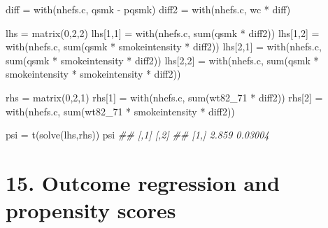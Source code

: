 \documentclass[
  10pt,
  a4paper,
]{book}
\newenvironment{Shaded}{\begin{snugshade}}{\end{snugshade}}
\newcommand{\DecValTok}[1]{\textcolor[rgb]{0.68,0.00,0.00}{#1}}
\newcommand{\DocumentationTok}[1]{\textcolor[rgb]{0.37,0.37,0.37}{\textit{#1}}}
\newcommand{\FunctionTok}[1]{\textcolor[rgb]{0.28,0.35,0.67}{#1}}
\newcommand{\NormalTok}[1]{\textcolor[rgb]{0.00,0.46,0.62}{#1}}
\newcommand{\OtherTok}[1]{\textcolor[rgb]{0.00,0.46,0.62}{#1}}
\newcommand{\SpecialCharTok}[1]{\textcolor[rgb]{0.37,0.37,0.37}{#1}}
\begin{document}
\begin{Shaded}
\begin{Highlighting}[]
\NormalTok{diff }\OtherTok{=} \FunctionTok{with}\NormalTok{(nhefs.c, qsmk }\SpecialCharTok{{-}}\NormalTok{ pqsmk)}
\NormalTok{diff2 }\OtherTok{=} \FunctionTok{with}\NormalTok{(nhefs.c, wc }\SpecialCharTok{*}\NormalTok{ diff)}

\NormalTok{lhs }\OtherTok{=} \FunctionTok{matrix}\NormalTok{(}\DecValTok{0}\NormalTok{,}\DecValTok{2}\NormalTok{,}\DecValTok{2}\NormalTok{)}
\NormalTok{lhs[}\DecValTok{1}\NormalTok{,}\DecValTok{1}\NormalTok{] }\OtherTok{=} \FunctionTok{with}\NormalTok{(nhefs.c, }\FunctionTok{sum}\NormalTok{(qsmk }\SpecialCharTok{*}\NormalTok{ diff2))}
\NormalTok{lhs[}\DecValTok{1}\NormalTok{,}\DecValTok{2}\NormalTok{] }\OtherTok{=} \FunctionTok{with}\NormalTok{(nhefs.c, }\FunctionTok{sum}\NormalTok{(qsmk }\SpecialCharTok{*}\NormalTok{ smokeintensity  }\SpecialCharTok{*}\NormalTok{ diff2))}
\NormalTok{lhs[}\DecValTok{2}\NormalTok{,}\DecValTok{1}\NormalTok{] }\OtherTok{=} \FunctionTok{with}\NormalTok{(nhefs.c, }\FunctionTok{sum}\NormalTok{(qsmk }\SpecialCharTok{*}\NormalTok{ smokeintensity }\SpecialCharTok{*}\NormalTok{ diff2))}
\NormalTok{lhs[}\DecValTok{2}\NormalTok{,}\DecValTok{2}\NormalTok{] }\OtherTok{=} \FunctionTok{with}\NormalTok{(nhefs.c, }\FunctionTok{sum}\NormalTok{(qsmk }\SpecialCharTok{*}\NormalTok{ smokeintensity }\SpecialCharTok{*}\NormalTok{ smokeintensity }\SpecialCharTok{*}\NormalTok{ diff2))}

\NormalTok{rhs }\OtherTok{=} \FunctionTok{matrix}\NormalTok{(}\DecValTok{0}\NormalTok{,}\DecValTok{2}\NormalTok{,}\DecValTok{1}\NormalTok{)}
\NormalTok{rhs[}\DecValTok{1}\NormalTok{] }\OtherTok{=} \FunctionTok{with}\NormalTok{(nhefs.c, }\FunctionTok{sum}\NormalTok{(wt82\_71 }\SpecialCharTok{*}\NormalTok{ diff2))}
\NormalTok{rhs[}\DecValTok{2}\NormalTok{] }\OtherTok{=} \FunctionTok{with}\NormalTok{(nhefs.c, }\FunctionTok{sum}\NormalTok{(wt82\_71 }\SpecialCharTok{*}\NormalTok{ smokeintensity }\SpecialCharTok{*}\NormalTok{ diff2))}

\NormalTok{psi }\OtherTok{=} \FunctionTok{t}\NormalTok{(}\FunctionTok{solve}\NormalTok{(lhs,rhs))}
\NormalTok{psi}
\DocumentationTok{\#\#       [,1]    [,2]}
\DocumentationTok{\#\# [1,] 2.859 0.03004}
\end{Highlighting}
\end{Shaded}

\chapter*{15. Outcome regression and propensity scores}\label{outcome-regression-and-propensity-scores}
\end{document}
